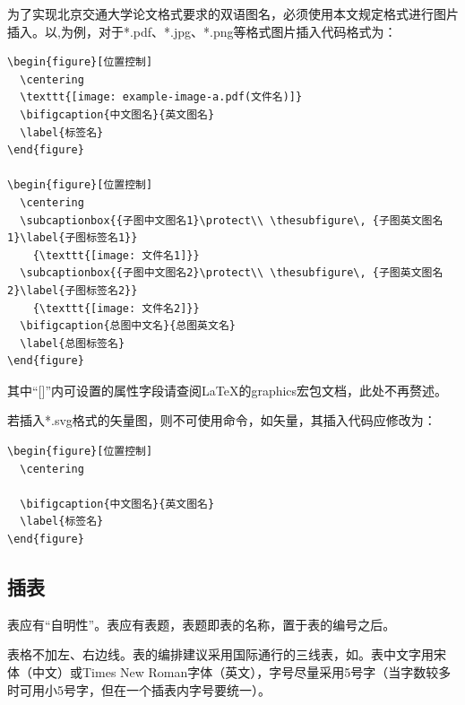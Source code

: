 为了实现北京交通大学论文格式要求的双语图名，必须使用本文规定格式进行图片插入。以,为例，对于*.pdf、*.jpg、*.png等格式图片插入代码格式为：

\begin{lstlisting}[language={[LaTeX]TeX}]
\begin{figure}[位置控制]
  \centering
  \texttt{[image: example-image-a.pdf(文件名)]}
  \bifigcaption{中文图名}{英文图名}
  \label{标签名}
\end{figure}

\begin{figure}[位置控制]
  \centering
  \subcaptionbox{{子图中文图名1}\protect\\ \thesubfigure\, {子图英文图名1}\label{子图标签名1}}
    {\texttt{[image: 文件名1]}}
  \subcaptionbox{{子图中文图名2}\protect\\ \thesubfigure\, {子图英文图名2}\label{子图标签名2}}
    {\texttt{[image: 文件名2]}}
  \bifigcaption{总图中文名}{总图英文名}
  \label{总图标签名}
\end{figure}
\end{lstlisting}

\noindent 其中“[]”内可设置的属性字段请查阅\LaTeX{}的graphics宏包文档\cite{CP2024Packagesgraphi}，此处不再赘述。

若插入*.svg格式的矢量图，则不可使用命令，如矢量，其插入代码应修改为：

\begin{figure}[H]
  \centering
  
  \label{猪肉刺身杯}
\end{figure}

\begin{lstlisting}[language={[LaTeX]TeX}]
\begin{figure}[位置控制]
  \centering
  
  \bifigcaption{中文图名}{英文图名}
  \label{标签名}
\end{figure}
\end{lstlisting}

\subsection{插表}
表应有“自明性”。表应有表题，表题即表的名称，置于表的编号之后。

表格不加左、右边线。表的编排建议采用国际通行的三线表，如。表中文字用宋
体（中文）或Times New Roman字体（英文），字号尽量采用5号字（当字数较多
时可用小5号字，但在一个插表内字号要统一）。 

